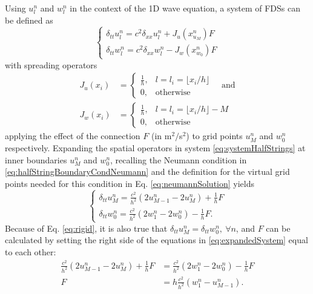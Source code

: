 Using $u_l^n$ and $w_l^n$ in the context of the 1D wave equation, a system of FDSs can be defined as
\begin{equation}
    \begin{cases}\label{eq:systemHalfStrings}
        \delta_{tt}u_l^n = c^2\delta_{xx}u_l^n + J_u(x_{u_M}^n)F\\
        \delta_{tt}w_l^n = c^2\delta_{xx}w_l^n - J_w(x_{w_0}^n)F
    \end{cases}
\end{equation}
with spreading operators
\begin{equation}\label{eq:spreadingOperators}
    \begin{aligned}
    J_u(x_i)& =
    \begin{cases}
        \frac{1}{h}, & l = l_i = \lfloor x_i/h\rfloor\\
        0,& \text{otherwise}
    \end{cases}
    \quad\text{and}\\
    J_w(x_i) &=
    \begin{cases}
        \frac{1}{h}, & l = l_i = \lfloor x_i/h \rfloor - M\\
        0,& \text{otherwise}
    \end{cases}
\end{aligned}
\end{equation}
applying the effect of the connection %
$F$ (in m$^2/$s$^2$) to grid points $u_M^n$ and $w_0^n$ respectively.
%
Expanding the spatial operators in system \eqref{eq:systemHalfStrings} at inner boundaries $u_M^n$ and $w_0^n$, recalling the Neumann condition in  \eqref{eq:halfStringBoundaryCondNeumann} and the definition for the virtual grid points needed for this condition in Eq. \eqref{eq:neumannSolution} yields
\begin{equation}\label{eq:expandedSystem}
    \begin{cases}
        \delta_{tt}u_M^n = \frac{c^2}{h^2}(2u_{M-1}^n-2u_M^n) + \frac{1}{h}F\\
        \delta_{tt}w_0^n = \frac{c^2}{h^2}(2w_1^n-2w_0^n) - \frac{1}{h}F.
    \end{cases}
\end{equation}
Because of Eq. \eqref{eq:rigid}, it is also true that $\delta_{tt}u_M^n = \delta_{tt}w_0^n, \ \forall n$, and $F$ can be calculated by setting the right side of the equations in \eqref{eq:expandedSystem} equal to each other:
\begin{align*}
     \frac{c^2}{h^2}(2u_{M-1}^n-2u_M^n) + \frac{1}{h} F&= 
     \frac{c^2}{h^2}(2w_1^n-2w_0^n) - \frac{1}{h} F\nonumber\\
    F &= h \frac{c^2}{h^2}(w_1^n - u_{M-1}^n).
\end{align*}
